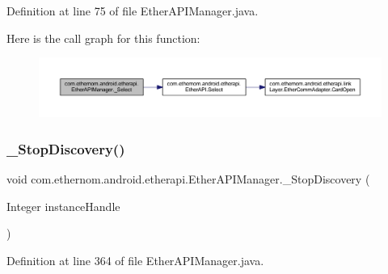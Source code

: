 Definition at line 75 of file Ether\+A\+P\+I\+Manager.\+java.

Here is the call graph for this function\+:\nopagebreak
\begin{figure}[H]
\begin{center}
\leavevmode
\includegraphics[width=350pt]{classcom_1_1ethernom_1_1android_1_1etherapi_1_1_ether_a_p_i_manager_af52a5c37a66de269e947018921f85b4f_cgraph}
\end{center}
\end{figure}
\mbox{\label{classcom_1_1ethernom_1_1android_1_1etherapi_1_1_ether_a_p_i_manager_af562559c5169777efdcb24b604a73a13}} 
\subsubsection{\texorpdfstring{\+\_\+\+Stop\+Discovery()}{\_StopDiscovery()}}
{\footnotesize\ttfamily void com.\+ethernom.\+android.\+etherapi.\+Ether\+A\+P\+I\+Manager.\+\_\+\+Stop\+Discovery (\begin{DoxyParamCaption}\item[{Integer}]{instance\+Handle }\end{DoxyParamCaption})}



Definition at line 364 of file Ether\+A\+P\+I\+Manager.\+java.

